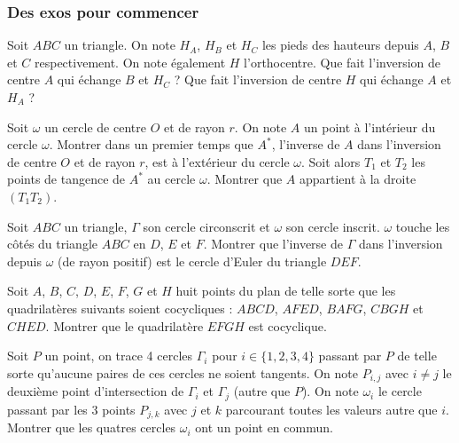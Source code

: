 \subsubsection{Des exos pour commencer}

\begin{exo}
Soit $ABC$ un triangle. On note $H_A$, $H_B$ et $H_C$ les pieds des hauteurs depuis $A$, $B$ et $C$ respectivement. On note également $H$ l'orthocentre. Que fait l'inversion de centre $A$ qui échange $B$ et $H_C$ ? Que fait l'inversion de centre $H$ qui échange $A$ et $H_A$ ?
\end{exo}

\begin{exo}
Soit $\omega$ un cercle de centre $O$ et de rayon $r$. On note $A$ un point à l'intérieur du cercle $\omega$. Montrer dans un premier temps que $A^*$, l'inverse de $A$ dans l'inversion de centre $O$ et de rayon $r$, est à l'extérieur du cercle $\omega$. Soit alors $T_1$ et $T_2$ les points de tangence de $A^*$ au cercle $\omega$. Montrer que $A$ appartient à la droite $(T_1T_2)$.
\end{exo}

\begin{exo}
Soit $ABC$ un triangle, $\Gamma$ son cercle circonscrit et $\omega$ son cercle inscrit. $\omega$ touche les côtés du triangle $ABC$ en $D$, $E$ et $F$. Montrer que l'inverse de $\Gamma$ dans l'inversion depuis $\omega$ (de rayon positif) est le cercle d'Euler du triangle $DEF$.
\end{exo}

\begin{exo}
Soit $A$, $B$, $C$, $D$, $E$, $F$, $G$ et $H$ huit points du plan de telle sorte que les quadrilatères suivants soient cocycliques : $ABCD$, $AFED$, $BAFG$, $CBGH$ et $CHED$. Montrer que le quadrilatère $EFGH$ est cocyclique.
\end{exo}

\begin{exo}
Soit $P$ un point, on trace 4 cercles $\Gamma_i$ pour $i \in \{1,2, 3, 4\}$ passant par $P$ de telle sorte qu'aucune paires de ces cercles ne soient tangents. On note $P_{i,j}$ avec $i\ne j$ le deuxième point d'intersection de $\Gamma_i$ et $\Gamma_j$ (autre que $P$). On note $\omega_i$ le cercle passant par les 3 points $P_{j,k}$ avec $j$ et $k$ parcourant toutes les valeurs autre que $i$. Montrer que les quatres cercles $\omega_i$ ont un point en commun.
\end{exo}

